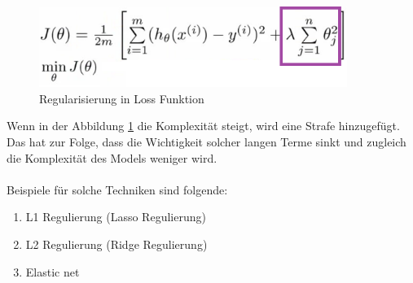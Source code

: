 \documentclass[12pt,oneside,a4paper,parskip]{scrbook}
\begin{document}
\begin{figure}[h]
	\begin{center}
		\includegraphics[width=10cm]{Bilder/regFunc.png}
		\caption{Regularisierung in Loss Funktion}
		\label{fig:regFunc}
	\end{center}
\end{figure}
Wenn in der Abbildung \ref{fig:regFunc} die Komplexität steigt, wird eine Strafe hinzugefügt. Das hat zur Folge, dass die Wichtigkeit solcher langen Terme sinkt und zugleich die Komplexität des Models weniger wird.
\\\\
Beispiele für solche Techniken sind folgende:
\begin{enumerate}
	\item L1 Regulierung (Lasso Regulierung)
	\item L2 Regulierung (Ridge Regulierung)
	\item Elastic net
\end{enumerate}
\end{document}
